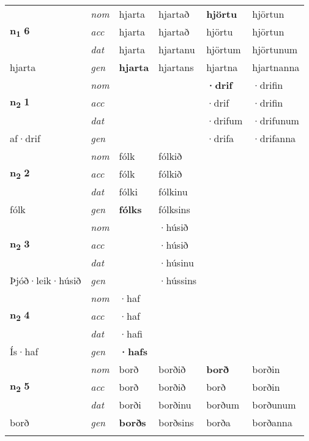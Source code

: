 \begin{longtable}[l]{X>{\footnotesize\itshape}XXXXX}
\multirow{3}{*}{{{\textbf{n{\textsubscript{1}}} \Large{\textbf{6}}}}} & nom & hjarta & hjartað & \textbf{hjörtu} & hjörtun \\*
 & acc & hjarta & hjartað & hjörtu & hjörtun \\*
 & dat & hjarta & hjartanu & hjörtum & hjörtunum \\*
 {\footnotesize{hjarta}} & gen & \textbf{hjarta} & hjartans & hjartna & hjartnanna \\
\cmidrule{1-6}

\multirow{3}{*}{{{\textbf{n{\textsubscript{2}}} \Large{\textbf{1}}}}} & nom &  &  & \textbf{·drif} & ·drifin \\*
 & acc &  &  & ·drif & ·drifin \\*
 & dat &  &  & ·drifum & ·drifunum \\*
 {\footnotesize{af\allowbreak ·drif}} & gen & \textbf{} &  & ·drifa & ·drifanna \\
\cmidrule{1-6}

\multirow{3}{*}{{{\textbf{n{\textsubscript{2}}} \Large{\textbf{2}}}}} & nom & fólk & fólkið & \textbf{} &  \\*
 & acc & fólk & fólkið &  &  \\*
 & dat & fólki & fólkinu &  &  \\*
 {\footnotesize{fólk}} & gen & \textbf{fólks} & fólksins &  &  \\
\cmidrule{1-6}

\multirow{3}{*}{{{\textbf{n{\textsubscript{2}}} \Large{\textbf{3}}}}} & nom &  & ·húsið & \textbf{} &  \\*
 & acc &  & ·húsið &  &  \\*
 & dat &  & ·húsinu &  &  \\*
 {\footnotesize{Þjóð\allowbreak ·leik\allowbreak ·húsið}} & gen & \textbf{} & ·hússins &  &  \\
\cmidrule{1-6}

\multirow{3}{*}{{{\textbf{n{\textsubscript{2}}} \Large{\textbf{4}}}}} & nom & ·haf &  & \textbf{} &  \\*
 & acc & ·haf &  &  &  \\*
 & dat & ·hafi &  &  &  \\*
 {\footnotesize{Ís\allowbreak ·haf}} & gen & \textbf{·hafs} &  &  &  \\
\cmidrule{1-6}

\multirow{3}{*}{{{\textbf{n{\textsubscript{2}}} \Large{\textbf{5}}}}} & nom & borð & borðið & \textbf{borð} & borðin \\*
 & acc & borð & borðið & borð & borðin \\*
 & dat & borði & borðinu & borðum & borðunum \\*
 {\footnotesize{borð}} & gen & \textbf{borðs} & borðsins & borða & borðanna \\*
 & &  &  &  &  \\


\end{longtable}
